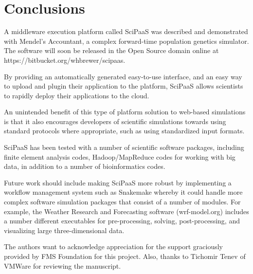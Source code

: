 \documentclass[10pt,reprint]{socc14}
\begin{document}
\section{Conclusions}

A middleware execution platform called SciPaaS was described and demonstrated with Mendel’s Accountant, a complex forward-time population genetics simulator.   The software will soon be released in the Open Source domain online at https://bitbucket.org/whbrewer/scipaas.

By providing an automatically generated easy-to-use interface, and an easy way to upload and plugin their application to the platform, SciPaaS allows scientists to rapidly deploy their applications to the cloud.

An unintended benefit of this type of platform solution to web-based simulations is that it also encourages developers of scientific simulations towards using standard protocols where appropriate, such as using standardized input formats.

SciPaaS has been tested with a number of scientific software packages, including finite element analysis codes, Hadoop/MapReduce codes for working with big data, in addition to a number of bioinformatics codes.

Future work should include making SciPaaS more robust by implementing a workflow management system such as Snakemake whereby it could handle more complex software simulation packages that consist of a number of modules.  For example, the Weather Research and Forecasting software (wrf-model.org) includes a number different executables for pre-processing, solving, post-processing, and visualizing large three-dimensional data.


\acks

The authors want to acknowledge appreciation for the support graciously provided by FMS Foundation for this project.  Also, thanks to Tichomir Tenev of VMWare for reviewing the manuscript.



\end{document}
